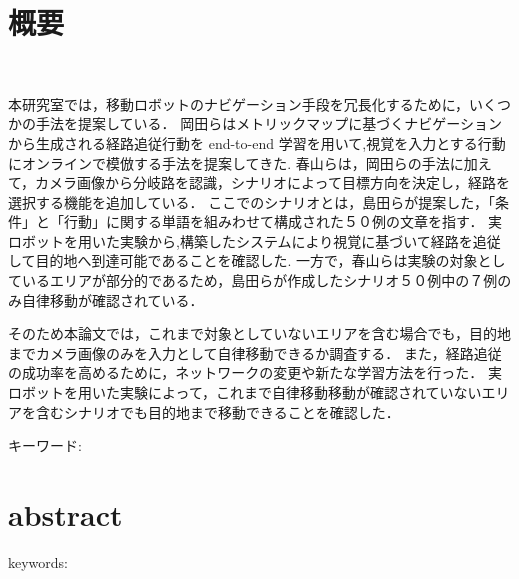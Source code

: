 \chapter*{概要}
\thispagestyle{empty}
%
\begin{center}
  \scalebox{1.5}{タイトル}\\
\end{center}
\vspace{1.0zh}

本研究室では，移動ロボットのナビゲーション手段を冗長化するために，いくつかの手法を提案している．
岡田らはメトリックマップに基づくナビゲーションから生成される経路追従行動を end-to-end 学習を用いて,視覚を入力とする行動にオンラインで模倣する手法を提案してきた.
春山らは，岡田らの手法に加えて，カメラ画像から分岐路を認識，シナリオによって目標方向を決定し，経路を選択する機能を追加している．
ここでのシナリオとは，島田らが提案した，「条件」と「行動」に関する単語を組みわせて構成された５０例の文章を指す．
実ロボットを用いた実験から,構築したシステムにより視覚に基づいて経路を追従して目的地へ到達可能であることを確認した.
一方で，春山らは実験の対象としているエリアが部分的であるため，島田らが作成したシナリオ５０例中の７例のみ自律移動が確認されている．

そのため本論文では，これまで対象としていないエリアを含む場合でも，目的地までカメラ画像のみを入力として自律移動できるか調査する．
また，経路追従の成功率を高めるために，ネットワークの変更や新たな学習方法を行った．
実ロボットを用いた実験によって，これまで自律移動移動が確認されていないエリアを含むシナリオでも目的地まで移動できることを確認した．

キーワード: 
%
\newpage
\chapter*{abstract}
\thispagestyle{empty}
%
\begin{center}
  \scalebox{1.3}{title}
\end{center}
\vspace{1.0zh}
%


keywords: 
